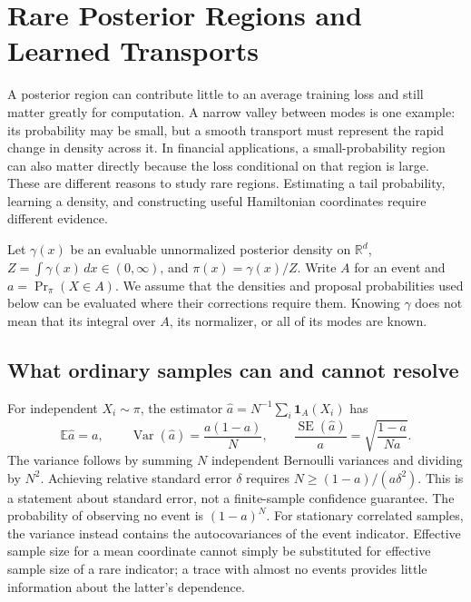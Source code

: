 \chapter[Rare Regions and Learned Transports]{Rare Posterior Regions and Learned Transports}
\label{ch:rare-regions-transport}

A posterior region can contribute little to an average training loss and still
matter greatly for computation. A narrow valley between modes is one example:
its probability may be small, but a smooth transport must represent the rapid
change in density across it. In financial applications, a small-probability
region can also matter directly because the loss conditional on that region is
large. These are different reasons to study rare regions. Estimating a tail
probability, learning a density, and constructing useful Hamiltonian coordinates
require different evidence.

Let $\gamma(x)$ be an evaluable unnormalized posterior density on
$\mathbb R^d$, $Z=\int\gamma(x)\,dx\in(0,\infty)$, and
$\pi(x)=\gamma(x)/Z$. Write $A$ for an event and
$a=\Pr_\pi(X\in A)$. We assume that the densities and proposal probabilities
used below can be evaluated where their corrections require them. Knowing
$\gamma$ does not mean that its integral over $A$, its normalizer, or all of
its modes are known.

\section[Precision from ordinary samples]{What ordinary samples can and cannot resolve}

For independent $X_i\sim\pi$, the estimator
$\widehat a=N^{-1}\sum_i\mathbf1_A(X_i)$ has
\begin{equation}
 \mathbb E\widehat a=a,\qquad
 \operatorname{Var}(\widehat a)=\frac{a(1-a)}{N},\qquad
 \frac{\operatorname{SE}(\widehat a)}{a}
 =\sqrt{\frac{1-a}{Na}}.
 \label{eq:rare-iid-error}
\end{equation}
The variance follows by summing $N$ independent Bernoulli variances and
dividing by $N^2$. Achieving relative standard error $\delta$ requires
$N\geq(1-a)/(a\delta^2)$. This is a statement about standard error, not a
finite-sample confidence guarantee. The probability of observing no event is
$(1-a)^N$. For stationary correlated samples, the variance instead contains
the autocovariances of the event indicator. Effective sample size for a mean
coordinate cannot simply be substituted for effective sample size of a rare
indicator; a trace with almost no events provides little information about
the latter's dependence.

